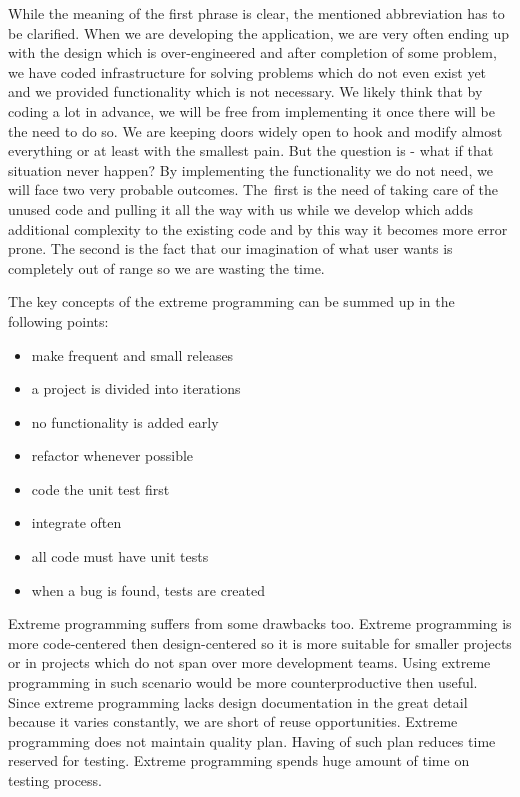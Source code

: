 \documentclass[12pt,final,oneside]{fithesis}
\begin{document}
While the meaning of the first phrase is clear, the mentioned abbreviation has to be clarified. When we are developing the application, we are very often ending up with the design which is over-engineered and after completion of some problem, we have coded infrastructure for solving problems which do not even exist yet and we provided functionality which is not necessary. We likely think that by coding a lot in advance, we will be free from implementing it once there will be the need to do so. We are keeping doors widely open to hook and modify almost everything or at least with the smallest pain. But the question is - what if that situation never happen? By implementing the functionality we do not need, we will face two very probable outcomes. The~first is the need of taking care of the unused code and pulling it all the way with us while we develop which adds additional complexity to the  existing code and by this way it becomes more error prone. The second is the fact that our imagination of what user wants is completely out of range so we are wasting the time.

The key concepts of the extreme programming can be summed up in the following points:
\begin{itemize}
	\item make frequent and small releases
	\item a project is divided into iterations
	\item no functionality is added early
	\item refactor whenever possible
	\item code the unit test first
	\item integrate often
	\item all code must have unit tests
	\item when a bug is found, tests are created
\end{itemize}   

Extreme programming suffers from some drawbacks too. Extreme programming is more code-centered then design-centered so it is more suitable for smaller projects or in projects which do not span over more development teams. Using extreme programming in such scenario would be more counterproductive then useful. Since extreme programming lacks design documentation in the great detail because it varies constantly, we are short of reuse opportunities. Extreme programming does not maintain quality plan. Having of such plan reduces time reserved for testing. Extreme programming spends huge amount of time on testing process. 
\end{document}
